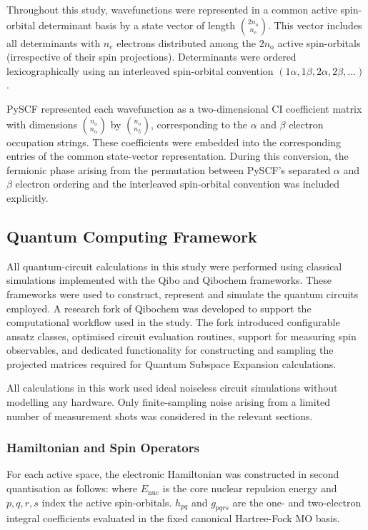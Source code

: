 Throughout this study, wavefunctions were represented in a common active spin-orbital determinant basis by a state vector of length $\binom{2 n_{\mathrm{o}}}{n_{\mathrm{e}}}$. 
This vector includes all determinants with $n_e$ electrons distributed among the $2n_{\mathrm{o}}$ active spin-orbitals (irrespective of their spin projections).
Determinants were ordered lexicographically using an interleaved spin-orbital convention $(1\alpha, 1\beta, 2\alpha, 2\beta, \ldots)$.

PySCF represented each wavefunction as a two-dimensional CI coefficient matrix with dimensions $\binom{n_{\mathrm{o}}}{n_{\mathrm{\alpha}}}$ by $\binom{n_{\mathrm{o}}}{n_{\mathrm{\beta}}}$, corresponding to the $\alpha$ and $\beta$ electron occupation strings. These coefficients were embedded into the corresponding entries of the common state-vector representation.  During this conversion, the fermionic phase arising from the permutation between PySCF's separated $\alpha$ and $\beta$ electron ordering and the interleaved spin-orbital convention was included explicitly.


\subsection{Quantum Computing Framework}
All quantum-circuit calculations in this study were performed using classical simulations implemented with the Qibo and Qibochem \cite{qibo2021,qibochem2024zenodo} frameworks. These frameworks were used to construct, represent and simulate the quantum circuits employed.
A research fork of Qibochem was developed to support the computational workflow used in the study. The fork introduced configurable ansatz classes, optimised circuit evaluation routines, support for measuring spin observables, and dedicated functionality for constructing and sampling the projected matrices required for Quantum Subspace Expansion calculations. 

All calculations in this work used ideal noiseless circuit simulations without modelling any hardware. Only finite-sampling noise arising from a limited number of measurement shots was considered in the relevant sections.

\subsubsection{Hamiltonian and Spin Operators}
For each active space, the electronic Hamiltonian was constructed in second quantisation as follows:
\ElectronicHamiltonianEquation
where $E_{\mathrm{nuc}}$ is the core nuclear repulsion energy and $p, q, r, s$ index the active spin-orbitals. $h_{pq}$ and $g_{pqrs}$ are the one- and two-electron integral coefficients evaluated in the fixed canonical Hartree-Fock MO basis.

